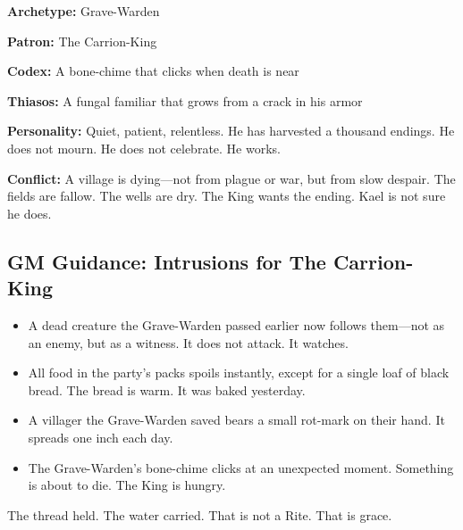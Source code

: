 \textbf{Archetype:} Grave-Warden

\textbf{Patron:} The Carrion-King

\textbf{Codex:} A bone-chime that clicks when death is near

\textbf{Thiasos:} A fungal familiar that grows from a crack in his armor

\textbf{Personality:} Quiet, patient, relentless. He has harvested a thousand endings. He does not mourn. He does not celebrate. He works.

\textbf{Conflict:} A village is dying—not from plague or war, but from slow despair. The fields are fallow. The wells are dry. The King wants the ending. Kael is not sure he does.

\subsection{GM Guidance: Intrusions for The Carrion-King}

\begin{itemize}
\item A dead creature the Grave-Warden passed earlier now follows them—not as an enemy, but as a witness. It does not attack. It watches.
\item All food in the party's packs spoils instantly, except for a single loaf of black bread. The bread is warm. It was baked yesterday.
\item A villager the Grave-Warden saved bears a small rot-mark on their hand. It spreads one inch each day.
\item The Grave-Warden's bone-chime clicks at an unexpected moment. Something is about to die. The King is hungry.
\end{itemize}

The thread held. The water carried. That is not a Rite. That is grace.

